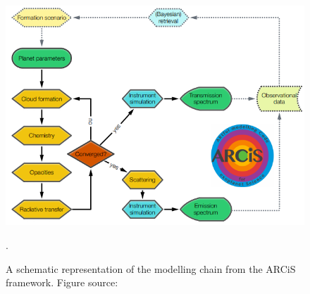 \begin{figure} [!htb]
    \centering
    \includegraphics[scale=0.6]{figuren/ARCiS_schematic.png}
    \caption{A schematic representation of the modelling chain from the ARCiS framework. Figure source: \cite{min2019arcis}}.
    \label{fig:arcis_schem}
\end{figure}


